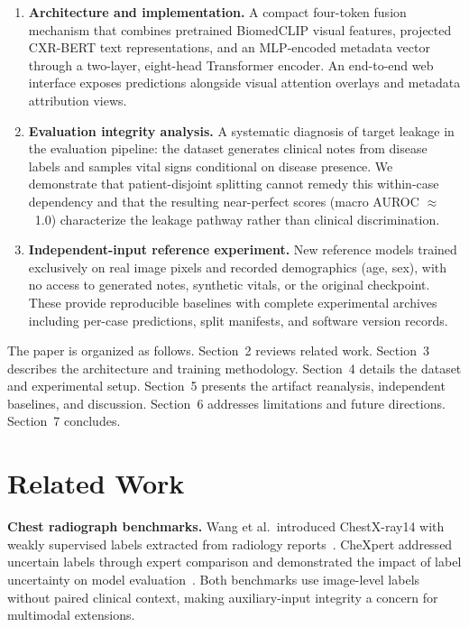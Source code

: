 \documentclass[runningheads,a4paper]{llncs}
\begin{document}
\begin{enumerate}
\item \textbf{Architecture and implementation.}
A compact four-token fusion mechanism that combines pretrained BiomedCLIP visual features, projected CXR-BERT text representations, and an MLP-encoded metadata vector through a two-layer, eight-head Transformer encoder.
An end-to-end web interface exposes predictions alongside visual attention overlays and metadata attribution views.

\item \textbf{Evaluation integrity analysis.}
A systematic diagnosis of target leakage in the evaluation pipeline: the dataset generates clinical notes from disease labels and samples vital signs conditional on disease presence.
We demonstrate that patient-disjoint splitting cannot remedy this within-case dependency and that the resulting near-perfect scores (macro AUROC $\approx$~1.0) characterize the leakage pathway rather than clinical discrimination.

\item \textbf{Independent-input reference experiment.}
New reference models trained exclusively on real image pixels and recorded demographics (age, sex), with no access to generated notes, synthetic vitals, or the original checkpoint.
These provide reproducible baselines with complete experimental archives including per-case predictions, split manifests, and software version records.
\end{enumerate}

The paper is organized as follows. Section~2 reviews related work. Section~3 describes the architecture and training methodology. Section~4 details the dataset and experimental setup. Section~5 presents the artifact reanalysis, independent baselines, and discussion. Section~6 addresses limitations and future directions. Section~7 concludes.

\section{Related Work}

\textbf{Chest radiograph benchmarks.}
Wang et al.\ introduced ChestX-ray14 with weakly supervised labels extracted from radiology reports~\cite{wang2017}.
CheXpert addressed uncertain labels through expert comparison and demonstrated the impact of label uncertainty on model evaluation~\cite{irvin2019}.
Both benchmarks use image-level labels without paired clinical context, making auxiliary-input integrity a concern for multimodal extensions.
\end{document}
